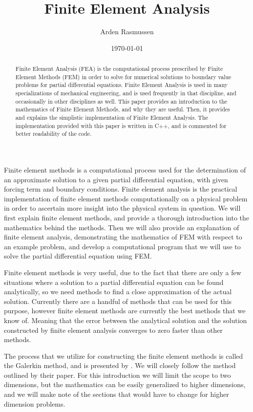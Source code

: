 \documentclass[draft,10pt]{armath}
\title{Finite Element Analysis}
\author{Arden Rasmussen}
\date{\today}
\numberwithin{equation}{section}
\theoremstyle{definition}
\begin{document}
\maketitle

\begin{abstract}
  Finite Element Analysis (FEA) is the computational process prescribed by
  Finite Element Methods (FEM) in order to solve for numerical solutions to
  boundary value problems for partial differential equations. Finite Element
  Analysis is used in many specializations of mechanical engineering, and is
  used frequently in that discipline, and occasionally in other disciplines as
  well. This paper provides an introduction to the mathematics of Finite
  Element Methods, and why they are useful. Then, it provides and explains the
  simplistic implementation of Finite Element Analysis. The implementation
  provided with this paper is written in C++, and is commented for better
  readability of the code.
\end{abstract}

Finite element methods is a computational process used for the determination of
an approximate solution to a given partial differential equation, with given
forcing term and boundary conditions. Finite element analysis is the practical
implementation of finite element methods computationally on a physical problem
in order to ascertain more insight into the physical system in question. We
will first explain finite element methods, and provide a thorough introduction
into the mathematics behind the methods. Then we will also provide an
explanation of finite element analysis, demonstrating the mathematics of FEM
with respect to an example problem, and develop a computational program that we
will use to solve the partial differential equation using FEM.

Finite element methods is very useful, due to the fact that there are only a
few situations where a solution to a partial differential equation can be found
analytically, so we need methods to find a close approximation of the actual
solution. Currently there are a handful of methods that can be used for this
purpose, however finite element methods are currently the best methods that we
know of. Meaning that the error between the analytical solution and the
solution constructed by finite element analysis converges to zero faster than
other methods.

The process that we utilize for constructing the finite element methods is
called the Galerkin method, and is presented by \cite{KH}. We will closely
follow the method outlined by their paper. For this introduction we will limit
the scope to two dimensions, but the mathematics can be easily generalized to
higher dimensions, and we will make note of the sections that would have to
change for higher dimension problems.
\end{document}
